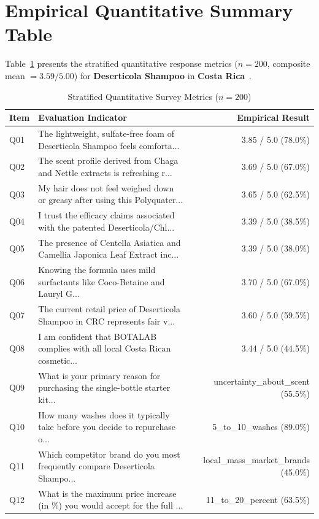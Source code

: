 \documentclass[10pt,twocolumn,a4paper]{article}
\begin{document}
\section{Empirical Quantitative Summary Table}
Table~\ref{tab:metrics} presents the stratified quantitative response metrics ($n = 200$, composite mean $= 3.59/5.00$) for \textbf{Deserticola Shampoo} in \textbf{Costa Rica}~\cite{ref_kaggle_doi,ref_hf_doi}.

\begin{table}[t]
\centering
\caption{Stratified Quantitative Survey Metrics ($n = 200$)}
\label{tab:metrics}
\small
\begin{tabularx}{\textwidth}{l X r}
\toprule
\textbf{Item} & \textbf{Evaluation Indicator} & \textbf{Empirical Result} \\
\midrule
Q01 & The lightweight, sulfate-free foam of Deserticola Shampoo feels comforta... & 3.85 / 5.0 (78.0\%) \\
Q02 & The scent profile derived from Chaga and Nettle extracts is refreshing r... & 3.69 / 5.0 (67.0\%) \\
Q03 & My hair does not feel weighed down or greasy after using this Polyquater... & 3.65 / 5.0 (62.5\%) \\
Q04 & I trust the efficacy claims associated with the patented Deserticola/Chl... & 3.39 / 5.0 (38.5\%) \\
Q05 & The presence of Centella Asiatica and Camellia Japonica Leaf Extract inc... & 3.39 / 5.0 (38.0\%) \\
Q06 & Knowing the formula uses mild surfactants like Coco-Betaine and Lauryl G... & 3.70 / 5.0 (67.0\%) \\
Q07 & The current retail price of Deserticola Shampoo in CRC represents fair v... & 3.60 / 5.0 (59.5\%) \\
Q08 & I am confident that BOTALAB complies with all local Costa Rican cosmetic... & 3.44 / 5.0 (44.5\%) \\
Q09 & What is your primary reason for purchasing the single-bottle starter kit... & uncertainty\_about\_scent (55.5\%) \\
Q10 & How many washes does it typically take before you decide to repurchase o... & 5\_to\_10\_washes (89.0\%) \\
Q11 & Which competitor brand do you most frequently compare Deserticola Shampo... & local\_mass\_market\_brands (45.0\%) \\
Q12 & What is the maximum price increase (in \%) you would accept for the full ... & 11\_to\_20\_percent (63.5\%) \\

\end{tabularx}
\end{table}
\end{document}
